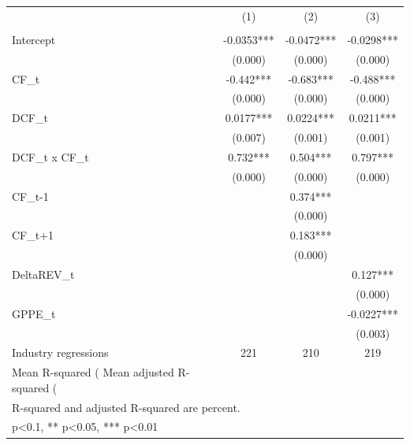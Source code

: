 {
\def\sym#1{\ifmmode^{#1}\else\(^{#1}\)\fi}
\begin{tabular}{l*{3}{c}}
\hline\hline
                    &\multicolumn{1}{c}{(1)}&\multicolumn{1}{c}{(2)}&\multicolumn{1}{c}{(3)}\\
                    &\multicolumn{1}{c}{}&\multicolumn{1}{c}{}&\multicolumn{1}{c}{}\\
\hline
Intercept           &     -0.0353***&     -0.0472***&     -0.0298***\\
                    &     (0.000)   &     (0.000)   &     (0.000)   \\
[1em]
CF\_t                &      -0.442***&      -0.683***&      -0.488***\\
                    &     (0.000)   &     (0.000)   &     (0.000)   \\
[1em]
DCF\_t               &      0.0177***&      0.0224***&      0.0211***\\
                    &     (0.007)   &     (0.001)   &     (0.001)   \\
[1em]
DCF\_t x CF\_t        &       0.732***&       0.504***&       0.797***\\
                    &     (0.000)   &     (0.000)   &     (0.000)   \\
[1em]
CF\_{t-1}            &               &       0.374***&               \\
                    &               &     (0.000)   &               \\
[1em]
CF\_{t+1}            &               &       0.183***&               \\
                    &               &     (0.000)   &               \\
[1em]
DeltaREV\_t          &               &               &       0.127***\\
                    &               &               &     (0.000)   \\
[1em]
GPPE\_t              &               &               &     -0.0227***\\
                    &               &               &     (0.003)   \\
\hline
Industry regressions&         221   &         210   &         219   \\
Mean R-squared (%
Mean adjusted R-squared (%
\hline\hline
\multicolumn{4}{l}{\footnotesize mean coefficients; p in parentheses}\\
\multicolumn{4}{l}{\footnotesize R-squared and adjusted R-squared are percent.}\\
\multicolumn{4}{l}{\footnotesize * p<0.1, ** p<0.05, *** p<0.01}\\
\end{tabular}
}
